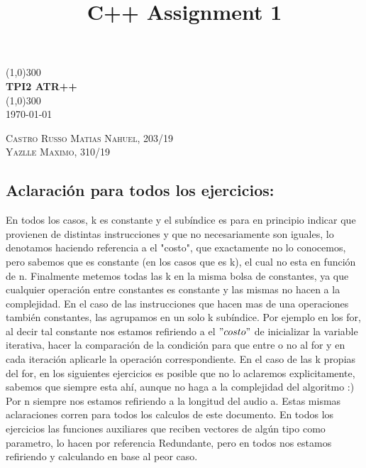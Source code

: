 \documentclass{article}
\title{C++ Assignment 1}
\begin{document}
\begin{titlepage}
	\begin{center}
    \line(1,0){300}\\
    [0.65cm]
	\huge{\bfseries TPI2 ATR++}\\
	\line(1,0){300}\\
	\textsc{\LARGE \today}\\
	[5.5cm]     
	\end{center}
	\begin{flushright}
		\textsc{\Large Castro Russo Matias Nahuel, 203/19}\\
		[0.5cm]
		\textsc{\Large Yazlle Maximo, 310/19}\\
		[0.5cm]
	\end{flushright}
\end{titlepage}

\subsection*{Aclaración para todos los ejercicios:} 
En todos los casos, k es constante y el subíndice es para en principio indicar que provienen de distintas instrucciones y que no necesariamente son iguales, lo denotamos haciendo referencia a el "costo", que exactamente no lo conocemos, pero sabemos que es constante (en los casos que es k), el cual no esta en función de n. Finalmente metemos todas las k en la misma bolsa de constantes, ya que cualquier operación entre constantes es constante y las mismas no hacen a la complejidad. \newline
En el caso de las instrucciones que hacen mas de una operaciones también constantes, las agrupamos en un solo k subíndice. Por ejemplo en los for, al decir tal constante nos estamos refiriendo a el $"costo"$ de inicializar la variable iterativa, hacer la comparación de la condición para que entre o no al for y en cada iteración aplicarle la operación correspondiente. En el caso de las k propias del for, en los siguientes ejercicios es posible que no lo aclaremos explicitamente, sabemos que siempre esta ahí, aunque no haga a la complejidad del algoritmo :)  \newline
Por n siempre nos estamos refiriendo a la longitud del audio a. \newline
Estas mismas aclaraciones corren para todos los calculos de este documento.\newline
En todos los ejercicios las funciones auxiliares que reciben vectores de algún tipo como parametro, lo hacen por referencia \newline
Redundante, pero en todos nos estamos refiriendo y calculando en base al peor caso. 
\end{document}
